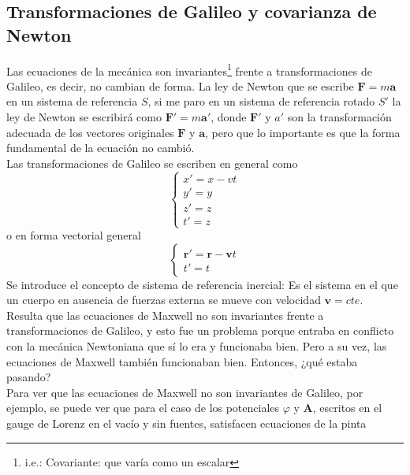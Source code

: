 

\subsection{Transformaciones de Galileo y covarianza de Newton}
Las ecuaciones de la mecánica son invariantes\footnote{i.e.: Covariante: que varía como un escalar} frente a transformaciones de Galileo, es decir, no cambian de forma. La ley de Newton que se escribe $\textbf{F} = m\textbf{a}$ en un sistema de referencia $S$, si me paro en un sistema de referencia rotado $S'$ la ley de Newton se escribirá como $\textbf{F}' = m\textbf{a}'$, donde $\textbf{F}'$ y $a'$ son la transformación adecuada de los vectores originales $\textbf{F}$ y $\textbf{a}$, pero que lo importante es que la forma fundamental de la ecuación no cambió.\\
\indent Las transformaciones de Galileo se escriben en general como
\begin{equation*}
    \left\{
        \begin{matrix}
            x' = x - vt\\
            y' = y\\
            z' = z\\
            t' = z
        \end{matrix}
    \right.
\end{equation*}
o en forma vectorial general
\begin{equation*}
    \left\{
        \begin{matrix}
            \textbf{r}' = \textbf{r} - \textbf{v}t\\
            t' = t
        \end{matrix}
    \right.
\end{equation*}
Se introduce el concepto de sistema de referencia inercial: Es el sistema en el que un cuerpo en ausencia de fuerzas externa se mueve con velocidad $\textbf{v} = cte$.\\
\indent Resulta que las ecuaciones de Maxwell no son invariantes frente a transformaciones de Galileo, y esto fue un problema porque entraba en conflicto con la mecánica Newtoniana que sí lo era y funcionaba bien. Pero a su vez, las ecuaciones de Maxwell también funcionaban bien. Entonces, ¿qué estaba pasando?\\
\indent Para ver que las ecuaciones de Maxwell no son invariantes de Galileo, por ejemplo, se puede ver que para el caso de los potenciales $\varphi$ y $\textbf{A}$, escritos en el gauge de Lorenz en el vacío y sin fuentes, satisfacen ecuaciones de la pinta
